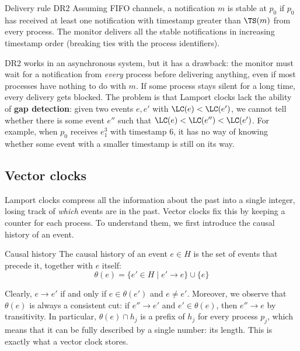 \begin{frameddefn}{Delivery rule DR2}
  Assuming FIFO channels, a notification $m$ is stable at $p_0$ if $p_0$ has received at least one notification with timestamp greater than $\TS(m)$ from every process. The monitor delivers all the stable notifications in increasing timestamp order (breaking ties with the process identifiers).
\end{frameddefn}

DR2 works in an asynchronous system, but it has a drawback: the monitor must wait for a notification from \textit{every} process before delivering anything, even if most processes have nothing to do with $m$. If some process stays silent for a long time, every delivery gets blocked. The problem is that Lamport clocks lack the ability of \textbf{gap detection}: given two events $e,e'$ with $\LC(e) < \LC(e')$, we cannot tell whether there is some event $e''$ such that $\LC(e) < \LC(e'') < \LC(e')$. For example, when $p_0$ receives $e_1^3$ with timestamp $6$, it has no way of knowing whether some event with a smaller timestamp is still on its way.

\subsection{Vector clocks}

Lamport clocks compress all the information about the past into a single integer, losing track of \textit{which} events are in the past. Vector clocks fix this by keeping a counter for each process. To understand them, we first introduce the causal history of an event.

\begin{frameddefn}{Causal history}
  The causal history of an event $e \in H$ is the set of events that precede it, together with $e$ itself:
  \[\theta(e) = \{e' \in H \mid e' \to e\} \cup \{e\}\]
\end{frameddefn}

Clearly, $e \to e'$ if and only if $e \in \theta(e')$ and $e \neq e'$. Moreover, we observe that $\theta(e)$ is always a consistent cut: if $e'' \to e'$ and $e' \in \theta(e)$, then $e'' \to e$ by transitivity. In particular, $\theta(e) \cap h_j$ is a prefix of $h_j$ for every process $p_j$, which means that it can be fully described by a single number: its length. This is exactly what a vector clock stores.

